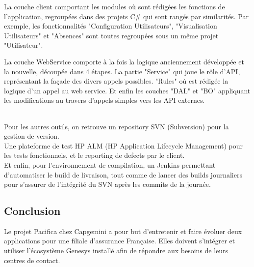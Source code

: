 \documentclass{rapport}
\begin{document}
\begin{minipage}{0.35\textwidth}
\end{minipage}
\begin{minipage}{0.55\textwidth}
La couche client comportant les modules où sont rédigées les fonctions de l'application, regroupées dans des projets C\# qui sont rangés par similarités. Par exemple, les fonctionnalités "Configuration Utilisateurs", "Visualisation Utilisateurs" et "Absences" sont toutes regroupées sous un même projet "Utilisateur".
\end{minipage}
\vspace{5mm} %

\begin{minipage}{0.35\textwidth}
\end{minipage}
\begin{minipage}{0.55\textwidth}
La couche WebService comporte à la fois la logique anciennement développée et la nouvelle, découpée dans 4 étapes. La partie "Service" qui joue le rôle d'API, représentant la façade des divers appels possibles. "Rules" où est rédigée la logique d'un appel au web service. Et enfin les couches "DAL" et "BO" appliquant les modifications au travers d'appels simples vers les API externes.
\end{minipage}
\vspace{5mm} %
\\

Pour les autres outils, on retrouve un repository SVN (Subversion) pour la gestion de version.\\
Une plateforme de test HP ALM (HP Application Lifecycle Management) pour les tests fonctionnels, et le reporting de defects par le client.\\
Et enfin, pour l'environnement de compilation, un Jenkins permettant d'automatiser le build de livraison, tout comme de lancer des builds journaliers pour s'assurer de l'intégrité du SVN après les commits de la journée.

\subsection*{Conclusion}

Le projet Pacifica chez Capgemini a pour but d'entretenir et faire évoluer deux applications pour une filiale d'assurance Française. Elles doivent s'intégrer et utiliser l'écosystème Genesys installé afin de répondre aux besoins de leurs centres de contact.\\
\end{document}
